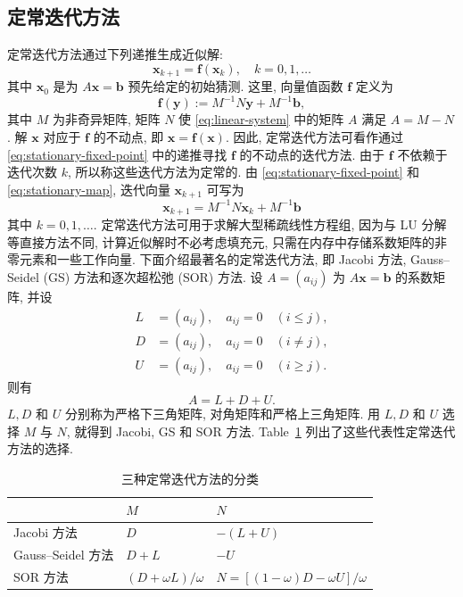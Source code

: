 \subsection{{定常迭代方法}}\label{sec:stationary-iterations}
{定常迭代方法通过下列递推生成近似解:}
\begin{equation}\label{eq:stationary-fixed-point}
\bm x_{k+1}=\bm f(\bm x_k),\quad k=0,1,\ldots
\end{equation}
{其中 $\bm x_0$ 是为 $A\bm x=\bm b$ 预先给定的初始猜测. 这里, 向量值函数 $\bm f$ 定义为}
\begin{equation}\label{eq:stationary-map}
\bm f(\bm y):=M^{-1}N\bm y+M^{-1}\bm b,
\end{equation}
{其中 $M$ 为非奇异矩阵, 矩阵 $N$ 使 \eqref{eq:linear-system} 中的矩阵 $A$ 满足 $A=M-N$. 解 $\bm x$ 对应于 $\bm f$ 的不动点, 即 $\bm x=\bm f(\bm x)$. 因此, 定常迭代方法可看作通过 \eqref{eq:stationary-fixed-point} 中的递推寻找 $\bm f$ 的不动点的迭代方法. 由于 $\bm f$ 不依赖于迭代次数 $k$, 所以称这些迭代方法为定常的. 由 \eqref{eq:stationary-fixed-point} 和 \eqref{eq:stationary-map}, 迭代向量 $\bm x_{k+1}$ 可写为}
\begin{equation}\label{eq:stationary-splitting-iteration}
\bm x_{k+1}=M^{-1}N\bm x_k+M^{-1}\bm b
\end{equation}
{其中 $k=0,1,\ldots$.}
{\leavevmode{}\label{idx:chapter-01-section-06:stationary-storage-and-splitting}定常迭代方法可用于求解大型稀疏线性方程组, 因为与 LU 分解等直接方法不同, 计算近似解时不必考虑填充元, 只需在内存中存储系数矩阵的非零元素和一些工作向量.}
{下面介绍最著名的定常迭代方法, 即 Jacobi 方法, Gauss--Seidel (GS) 方法和逐次超松弛 (SOR) 方法. 设 $A=(a_{ij})$ 为 $A\bm x=\bm b$ 的系数矩阵, 并设}
\[
\begin{aligned}
L&=(a_{ij}),\quad a_{ij}=0\quad(i\le j),\\
D&=(a_{ij}),\quad a_{ij}=0\quad(i\ne j),\\
U&=(a_{ij}),\quad a_{ij}=0\quad(i\ge j).
\end{aligned}
\]
{则有}
\[A=L+D+U.\]
{$L,D$ 和 $U$ 分别称为严格下三角矩阵, 对角矩阵和严格上三角矩阵.}
{用 $L,D$ 和 $U$ 选择 $M$ 与 $N$, 就得到 Jacobi, GS 和 SOR 方法. Table~\ref{tab:stationary-splittings} 列出了这些代表性定常迭代方法的选择.}
\begin{table}[H]\centering
\caption{{三种定常迭代方法的分类}}\label{tab:stationary-splittings}
\begin{tabular}{lll}\hline
& $M$ & $N$\\\hline
Jacobi {方法} & $D$ & $-(L+U)$\\
Gauss--Seidel {方法} & $D+L$ & $-U$\\
SOR {方法} & $(D+\omega L)/\omega$ & $N=[(1-\omega)D-\omega U]/\omega$\\\hline
\end{tabular}\end{table}
